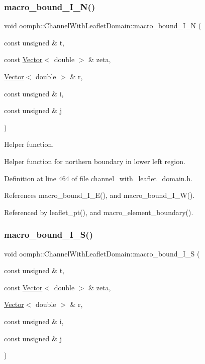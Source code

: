 \subsubsection{\texorpdfstring{macro\+\_\+bound\+\_\+\+I\+\_\+\+N()}{macro\_bound\_I\_N()}}
{\footnotesize\ttfamily void oomph\+::\+Channel\+With\+Leaflet\+Domain\+::macro\+\_\+bound\+\_\+\+I\+\_\+N (\begin{DoxyParamCaption}\item[{const unsigned \&}]{t,  }\item[{const \hyperlink{classoomph_1_1Vector}{Vector}$<$ double $>$ \&}]{zeta,  }\item[{\hyperlink{classoomph_1_1Vector}{Vector}$<$ double $>$ \&}]{r,  }\item[{const unsigned \&}]{i,  }\item[{const unsigned \&}]{j }\end{DoxyParamCaption})\hspace{0.3cm}{\ttfamily [protected]}}



Helper function. 

Helper function for northern boundary in lower left region. 

Definition at line 464 of file channel\+\_\+with\+\_\+leaflet\+\_\+domain.\+h.



References macro\+\_\+bound\+\_\+\+I\+\_\+\+E(), and macro\+\_\+bound\+\_\+\+I\+\_\+\+W().



Referenced by leaflet\+\_\+pt(), and macro\+\_\+element\+\_\+boundary().

\mbox{\label{classoomph_1_1ChannelWithLeafletDomain_a20898c8b6747cf01e3e92e4a5c6ff5e4}} 
\subsubsection{\texorpdfstring{macro\+\_\+bound\+\_\+\+I\+\_\+\+S()}{macro\_bound\_I\_S()}}
{\footnotesize\ttfamily void oomph\+::\+Channel\+With\+Leaflet\+Domain\+::macro\+\_\+bound\+\_\+\+I\+\_\+S (\begin{DoxyParamCaption}\item[{const unsigned \&}]{t,  }\item[{const \hyperlink{classoomph_1_1Vector}{Vector}$<$ double $>$ \&}]{zeta,  }\item[{\hyperlink{classoomph_1_1Vector}{Vector}$<$ double $>$ \&}]{r,  }\item[{const unsigned \&}]{i,  }\item[{const unsigned \&}]{j }\end{DoxyParamCaption})\hspace{0.3cm}{\ttfamily [protected]}}



